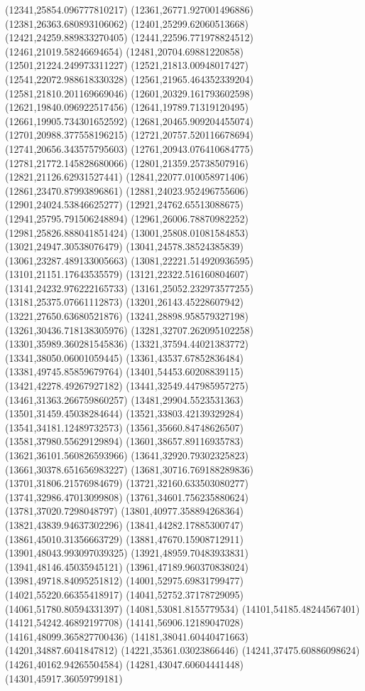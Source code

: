 {(12341,25854.096777810217)
(12361,26771.927001496886)
(12381,26363.680893106062)
(12401,25299.62060513668)
(12421,24259.889833270405)
(12441,22596.771978824512)
(12461,21019.58246694654)
(12481,20704.69881220858)
(12501,21224.249973311227)
(12521,21813.00948017427)
(12541,22072.988618330328)
(12561,21965.464352339204)
(12581,21810.201169669046)
(12601,20329.161793602598)
(12621,19840.096922517456)
(12641,19789.71319120495)
(12661,19905.734301652592)
(12681,20465.909204455074)
(12701,20988.377558196215)
(12721,20757.520116678694)
(12741,20656.343575795603)
(12761,20943.076410684775)
(12781,21772.145828680066)
(12801,21359.25738507916)
(12821,21126.62931527441)
(12841,22077.010058971406)
(12861,23470.87993896861)
(12881,24023.952496755606)
(12901,24024.53846625277)
(12921,24762.65513088675)
(12941,25795.791506248894)
(12961,26006.78870982252)
(12981,25826.888041851424)
(13001,25808.01081584853)
(13021,24947.30538076479)
(13041,24578.38524385839)
(13061,23287.489133005663)
(13081,22221.514920936595)
(13101,21151.17643535579)
(13121,22322.516160804607)
(13141,24232.976222165733)
(13161,25052.232973577255)
(13181,25375.07661112873)
(13201,26143.45228607942)
(13221,27650.63680521876)
(13241,28898.958579327198)
(13261,30436.718138305976)
(13281,32707.262095102258)
(13301,35989.360281545836)
(13321,37594.44021383772)
(13341,38050.06001059445)
(13361,43537.67852836484)
(13381,49745.85859679764)
(13401,54453.60208839115)
(13421,42278.49267927182)
(13441,32549.447985957275)
(13461,31363.266759860257)
(13481,29904.5523531363)
(13501,31459.45038284644)
(13521,33803.42139329284)
(13541,34181.12489732573)
(13561,35660.84748626507)
(13581,37980.55629129894)
(13601,38657.89116935783)
(13621,36101.560826593966)
(13641,32920.79302325823)
(13661,30378.651656983227)
(13681,30716.769188289836)
(13701,31806.21576984679)
(13721,32160.633503080277)
(13741,32986.47013099808)
(13761,34601.756235880624)
(13781,37020.7298048797)
(13801,40977.358894268364)
(13821,43839.94637302296)
(13841,44282.17885300747)
(13861,45010.31356663729)
(13881,47670.15908712911)
(13901,48043.993097039325)
(13921,48959.70483933831)
(13941,48146.45035945121)
(13961,47189.960370838024)
(13981,49718.84095251812)
(14001,52975.69831799477)
(14021,55220.66355418917)
(14041,52752.37178729095)
(14061,51780.80594331397)
(14081,53081.8155779534)
(14101,54185.48244567401)
(14121,54242.46892197708)
(14141,56906.12189047028)
(14161,48099.365827700436)
(14181,38041.60440471663)
(14201,34887.6041847812)
(14221,35361.03023866446)
(14241,37475.60886098624)
(14261,40162.94265504584)
(14281,43047.60604441448)
(14301,45917.36059799181)
}
